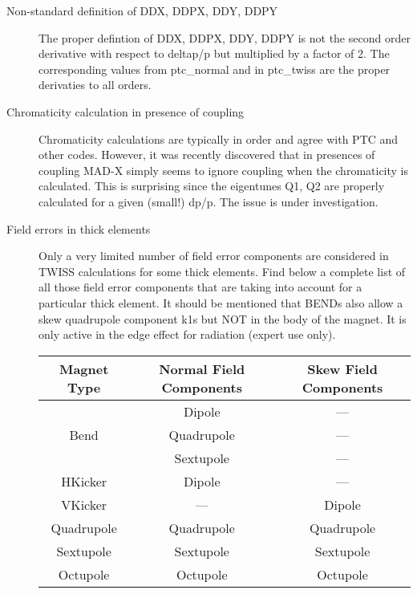 \begin{description}
\item[Non-standard definition of DDX, DDPX, DDY, DDPY] 
  The \madx proper defintion of DDX, DDPX, DDY, DDPY is not the second
  order derivative with respect to deltap/p but multiplied by a factor
  of 2. The corresponding values from ptc\_normal and in ptc\_twiss
  are the proper derivaties to all orders.  
  

\item[Chromaticity calculation in presence of coupling] 
  Chromaticity calculations are typically in order and agree with PTC
  and other codes. However, it was recently discovered that in
  presences of coupling MAD-X simply seems to ignore coupling when the
  chromaticity is calculated. This is surprising since the eigentunes
  Q1, Q2 are properly calculated for a given (small!) dp/p. The issue
  is under investigation.  


\item[Field errors in thick elements]
  Only a very limited number of field error components are
  considered in TWISS calculations for some thick elements. Find below
  a complete list of all those field error components that
  are taking into account for a particular thick element. It
  should be mentioned that BENDs also allow a skew quadrupole
  component k1s but NOT in the body of the magnet. It is only
  active in the edge effect for radiation (expert use only). 


{\renewcommand{\arraystretch}{2}
  \begin{tabular}{c | c | c}
    \hline 
    \textbf{Magnet Type} & \textbf{Normal Field Components} & \textbf{Skew Field Components} \\ 
    \hline
    & Dipole & ---\\
    Bend & Quadrupole & ---\\
    & Sextupole & ---\\
    \hline
    HKicker & Dipole & ---\\
    \hline
    VKicker & --- & Dipole\\
    \hline
    Quadrupole & Quadrupole & Quadrupole \\
    \hline
    Sextupole & Sextupole & Sextupole \\
    \hline
    Octupole & Octupole & Octupole \\
    \hline
  \end{tabular}
}


\end{description}
